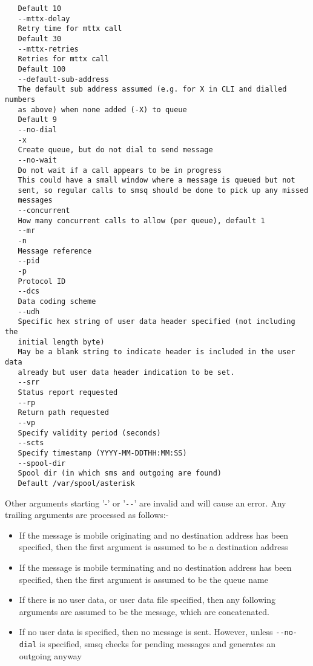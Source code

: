\begin{verbatim}
   Default 10
   --mttx-delay
   Retry time for mttx call
   Default 30
   --mttx-retries
   Retries for mttx call
   Default 100
   --default-sub-address
   The default sub address assumed (e.g. for X in CLI and dialled numbers
   as above) when none added (-X) to queue
   Default 9
   --no-dial
   -x
   Create queue, but do not dial to send message
   --no-wait
   Do not wait if a call appears to be in progress
   This could have a small window where a message is queued but not
   sent, so regular calls to smsq should be done to pick up any missed
   messages
   --concurrent
   How many concurrent calls to allow (per queue), default 1
   --mr
   -n
   Message reference
   --pid
   -p
   Protocol ID
   --dcs
   Data coding scheme
   --udh
   Specific hex string of user data header specified (not including the
   initial length byte)
   May be a blank string to indicate header is included in the user data
   already but user data header indication to be set.
   --srr
   Status report requested
   --rp
   Return path requested
   --vp
   Specify validity period (seconds)
   --scts
   Specify timestamp (YYYY-MM-DDTHH:MM:SS)
   --spool-dir
   Spool dir (in which sms and outgoing are found)
   Default /var/spool/asterisk
\end{verbatim}

   Other arguments starting '-' or '\verb!--!' are invalid and will cause an
   error. Any trailing arguments are processed as follows:-

\begin{itemize}
    
     \item If the message is mobile originating and no destination address
       has been specified, then the first argument is assumed to be a
       destination address

     \item If the message is mobile terminating and no destination address
       has been specified, then the first argument is assumed to be the
       queue name

     \item If there is no user data, or user data file specified, then any
       following arguments are assumed to be the message, which are
       concatenated.

     \item If no user data is specified, then no message is sent. However,
       unless \verb!--no-dial! is specified, smsq checks for pending messages
       and generates an outgoing anyway
\end{itemize}


